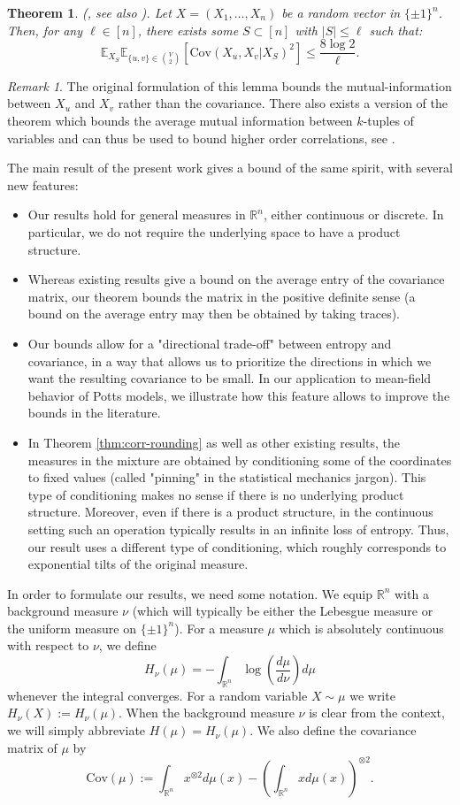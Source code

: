 \documentclass[12pt]{article}
\def \RR {\mathbb R}
\def \EE {\mathbb E}
\def \Cov {\mathrm {Cov}}
\def \Cov {\mathrm{Cov}}
\newtheorem{theorem}{Theorem}
\theoremstyle{definition}
\theoremstyle{remark}
\newtheorem{remark}{Remark}
\begin{document}
\begin{theorem} \label{thm:one} (\cite{RT12}, see also \cite{JKR18}).
	\label{thm:corr-rounding}
	Let $X = (X_1,\dots, X_n)$ be a random vector in $\{\pm 1\}^n$. Then, for any $\ell \in [n]$, there exists some $S \subset [n]$ with $|S| \leq \ell$ such that:
	$$\EE_{X_S} \EE_{\{u,v\} \in {V \choose 2}}\left[\Cov(X_u,X_v | X_S)^2\right] \le \frac{8\log 2}{\ell}.$$
\end{theorem}
\begin{remark}
The original formulation of this lemma bounds the mutual-information between $X_u$ and $X_v$ rather than the covariance. There also exists a version of the theorem which bounds the average mutual information between $k$-tuples of variables and can thus be used to bound higher order correlations, see \cite{JKR18}.
\end{remark}
\bigskip
\noindent The main result of the present work gives a bound of the same spirit, with several new features:
\begin{itemize}
\item
Our results hold for general measures in $\RR^n$, either continuous or discrete. In particular, we do not require the underlying space to have a product structure.
\item
Whereas existing results give a bound on the average entry of the covariance matrix, our theorem bounds the matrix in the positive definite sense (a bound on the average entry may then be obtained by taking traces).
\item
Our bounds allow for a "directional trade-off" between entropy and covariance, in a way that allows us to prioritize the directions in which we want the resulting covariance to be small. In our application to mean-field behavior of Potts models, we illustrate how this feature allows to improve the bounds in the literature.
\item
In Theorem \ref{thm:corr-rounding} as well as other existing results, the measures in the mixture are obtained by conditioning some of the coordinates to fixed values (called "pinning" in the statistical mechanics jargon). This type of conditioning makes no sense if there is no underlying product structure. Moreover, even if there is a product structure, in the continuous setting such an operation typically results in an infinite loss of entropy. Thus, our result uses a different type of conditioning, which roughly corresponds to exponential tilts of the original measure.
\end{itemize}
\bigskip
In order to formulate our results, we need some notation. We equip $\RR^n$ with a background measure $\nu$ (which will typically be either the Lebesgue measure or the uniform measure on $\{\pm 1\}^n$). For a measure $\mu$ which is absolutely continuous with respect to $\nu$, we define
$$
H_\nu(\mu) = - \int_{\RR^n} \log \left ( \frac{d \mu}{d \nu} \right ) d \mu
$$
whenever the integral converges. For a random variable $X \sim \mu$ we write $H_\nu(X) := H_\nu(\mu)$. When the background measure $\nu$ is clear from the context, we will simply abbreviate $H(\mu) = H_\nu (\mu)$. We also define the covariance matrix of $\mu$ by
$$
\Cov(\mu) := \int_{\RR^n} x^{\otimes 2} d \mu(x) - \left (\int_{\RR^n} x d \mu(x) \right )^{\otimes 2}.
$$
\end{document}

